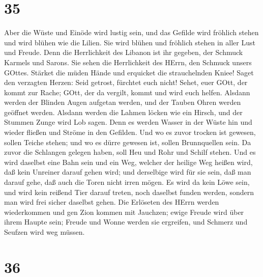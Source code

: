 \hypertarget{section-34}{%
\section{35}\label{section-34}}

 Aber die Wüste und Einöde wird lustig sein, und das Gefilde
wird fröhlich stehen und wird blühen wie die Lilien.  Sie
wird blühen und fröhlich stehen in aller Lust und Freude. Denn die
Herrlichkeit des Libanon ist ihr gegeben, der Schmuck Karmels und
Sarons. Sie sehen die Herrlichkeit des HErrn, den Schmuck unsers GOttes.
 Stärket die müden Hände und erquicket die strauchelnden
Kniee!  Saget den verzagten Herzen: Seid getrost, fürchtet
euch nicht! Sehet, euer GOtt, der kommt zur Rache; GOtt, der da vergilt,
kommt und wird euch helfen.  Alsdann werden der Blinden
Augen aufgetan werden, und der Tauben Ohren werden geöffnet werden.
 Alsdann werden die Lahmen löcken wie ein Hirsch, und der
Stummen Zunge wird Lob sagen. Denn es werden Wasser in der Wüste hin und
wieder fließen und Ströme in den Gefilden.  Und wo es zuvor
trocken ist gewesen, sollen Teiche stehen; und wo es dürre gewesen ist,
sollen Brunnquellen sein. Da zuvor die Schlangen gelegen haben, soll Heu
und Rohr und Schilf stehen.  Und es wird daselbst eine Bahn
sein und ein Weg, welcher der heilige Weg heißen wird, daß kein Unreiner
darauf gehen wird; und derselbige wird für sie sein, daß man darauf
gehe, daß auch die Toren nicht irren mögen.  Es wird da kein
Löwe sein, und wird kein reißend Tier darauf treten, noch daselbst
funden werden, sondern man wird frei sicher daselbst gehen.
 Die Erlöseten des HErrn werden wiederkommen und gen Zion
kommen mit Jauchzen; ewige Freude wird über ihrem Haupte sein; Freude
und Wonne werden sie ergreifen, und Schmerz und Seufzen wird weg müssen.

\hypertarget{section-35}{%
\section{36}\label{section-35}}

